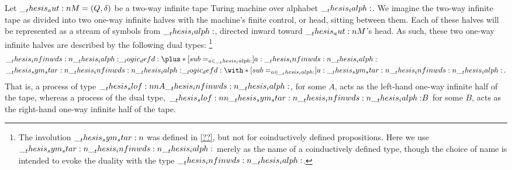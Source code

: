 Let $\__thesis_aut:n {M} = (Q, \delta)$ be a two-way infinite tape Turing machine over alphabet $\__thesis_ialph:$.
We imagine the two-way infinite tape as divided into two one-way infinite halves with the machine's finite control, or head, sitting between them.
Each of these halves will be represented as a stream of symbols from $\__thesis_ialph:$, directed inward toward $\__thesis_aut:n {M}$'s head.
As such, these two one-way infinite halves are described by the following dual types:%
\footnote{The involution $\sym*{}$ was defined in \cref{??}, but not for coinductively defined propositions.
  Here we use $\sym*{\infinwds{\ialph}}$ merely as the name of a coinductively defined type, though the choice of name is intended to evoke the duality with the type $\__thesis_infinwds:n {\__thesis_ialph:}$.}%
\begin{equation*}
  \begin{lgathered}
    \infinwds{\ialph} \defd \plus*[sub=_{a \in \ialph}]{ a: \infinwds{\ialph} } \\
    \sym*{\infinwds{\ialph}} \defd \with*[sub=_{a \in \ialph}]{ a : \sym*{\infinwds{\ialph}} }
  \,.
  \end{lgathered}
\end{equation*}
That is, a process of type $\slof{ A |- \infinwds{\ialph} }$, for some $A$, acts as the left-hand one-way infinite half of the tape, whereas a process of the dual type, $\slof{ \sym*{\infinwds{\ialph}} |- B }$ for some $B$, acts as the right-hand one-way infinite half of the tape.

